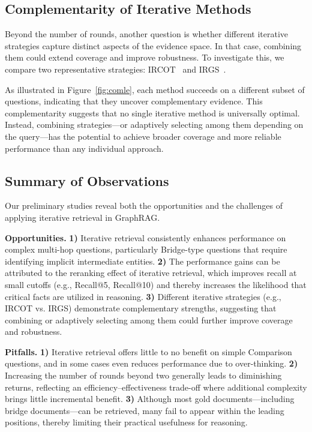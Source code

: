 \documentclass{article} %
\begin{document}
\subsection{Complementarity of Iterative Methods}
Beyond the number of rounds, another question is whether different iterative strategies capture distinct aspects of the evidence space. In that case, combining them could extend coverage and improve robustness. To investigate this, we compare two representative strategies: IRCOT~\citep{trivedi2022interleaving} and IRGS~\citep{shao2023enhancing}.

As illustrated in Figure~\ref{fig:comle}, each method succeeds on a different subset of questions, 
indicating that they uncover complementary evidence. 
This complementarity suggests that no single iterative method is universally optimal. 
Instead, combining strategies—or adaptively selecting among them depending on the query—has the potential to achieve broader coverage 
and more reliable performance than any individual approach.


\subsection{Summary of Observations}

Our preliminary studies reveal both the opportunities and the challenges of applying iterative retrieval in GraphRAG.  

\textbf{Opportunities.}  \textbf{1)} Iterative retrieval consistently enhances performance on complex multi-hop questions, particularly Bridge-type questions that require identifying implicit intermediate entities.  
\textbf{2)} The performance gains can be attributed to the reranking effect of iterative retrieval, which improves recall at small cutoffs (e.g., Recall@5, Recall@10) and thereby increases the likelihood that critical  facts are utilized in reasoning.
\textbf{3)} Different iterative strategies (e.g., IRCOT vs. IRGS) demonstrate complementary strengths, suggesting that combining or adaptively selecting among them could further improve coverage and robustness.  


\textbf{Pitfalls.}  
\textbf{1)} Iterative retrieval offers little to no benefit on simple Comparison questions, and in some cases even reduces performance due to over-thinking.  
\textbf{2)} Increasing the number of rounds beyond two generally leads to diminishing returns, reflecting an efficiency–effectiveness trade-off where additional complexity brings little incremental benefit.  
\textbf{3)} Although most gold documents—including bridge documents—can be retrieved, many fail to appear within the leading positions, thereby limiting their practical usefulness for reasoning.
\end{document}
